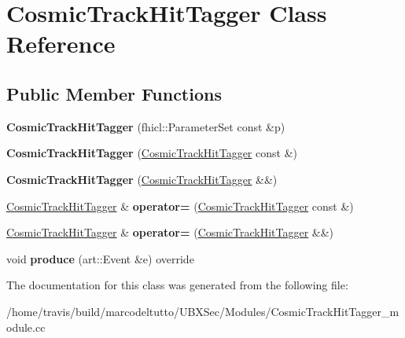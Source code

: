 \hypertarget{classCosmicTrackHitTagger}{\section{\-Cosmic\-Track\-Hit\-Tagger \-Class \-Reference}
\label{classCosmicTrackHitTagger}
}
\subsection*{\-Public \-Member \-Functions}
\begin{DoxyCompactItemize}
\item 
\hypertarget{classCosmicTrackHitTagger_ac6a0456ac0a13fd69a9ff4b02882f0a5}{{\bfseries \-Cosmic\-Track\-Hit\-Tagger} (fhicl\-::\-Parameter\-Set const \&p)}\label{classCosmicTrackHitTagger_ac6a0456ac0a13fd69a9ff4b02882f0a5}

\item 
\hypertarget{classCosmicTrackHitTagger_af3e45280dce8052554200f2ce9747d91}{{\bfseries \-Cosmic\-Track\-Hit\-Tagger} (\hyperlink{classCosmicTrackHitTagger}{\-Cosmic\-Track\-Hit\-Tagger} const \&)}\label{classCosmicTrackHitTagger_af3e45280dce8052554200f2ce9747d91}

\item 
\hypertarget{classCosmicTrackHitTagger_acd90e92f731d5f864b197bfb45fdc9e9}{{\bfseries \-Cosmic\-Track\-Hit\-Tagger} (\hyperlink{classCosmicTrackHitTagger}{\-Cosmic\-Track\-Hit\-Tagger} \&\&)}\label{classCosmicTrackHitTagger_acd90e92f731d5f864b197bfb45fdc9e9}

\item 
\hypertarget{classCosmicTrackHitTagger_a9d2061618b87abd86743ae22d73f3818}{\hyperlink{classCosmicTrackHitTagger}{\-Cosmic\-Track\-Hit\-Tagger} \& {\bfseries operator=} (\hyperlink{classCosmicTrackHitTagger}{\-Cosmic\-Track\-Hit\-Tagger} const \&)}\label{classCosmicTrackHitTagger_a9d2061618b87abd86743ae22d73f3818}

\item 
\hypertarget{classCosmicTrackHitTagger_a8db750142089fd6139c6d4deda268fd5}{\hyperlink{classCosmicTrackHitTagger}{\-Cosmic\-Track\-Hit\-Tagger} \& {\bfseries operator=} (\hyperlink{classCosmicTrackHitTagger}{\-Cosmic\-Track\-Hit\-Tagger} \&\&)}\label{classCosmicTrackHitTagger_a8db750142089fd6139c6d4deda268fd5}

\item 
\hypertarget{classCosmicTrackHitTagger_a6ffc6038717475e1887296c8b4fbacae}{void {\bfseries produce} (art\-::\-Event \&e) override}\label{classCosmicTrackHitTagger_a6ffc6038717475e1887296c8b4fbacae}

\end{DoxyCompactItemize}


\-The documentation for this class was generated from the following file\-:\begin{DoxyCompactItemize}
\item 
/home/travis/build/marcodeltutto/\-U\-B\-X\-Sec/\-Modules/\-Cosmic\-Track\-Hit\-Tagger\-\_\-module.\-cc\end{DoxyCompactItemize}
